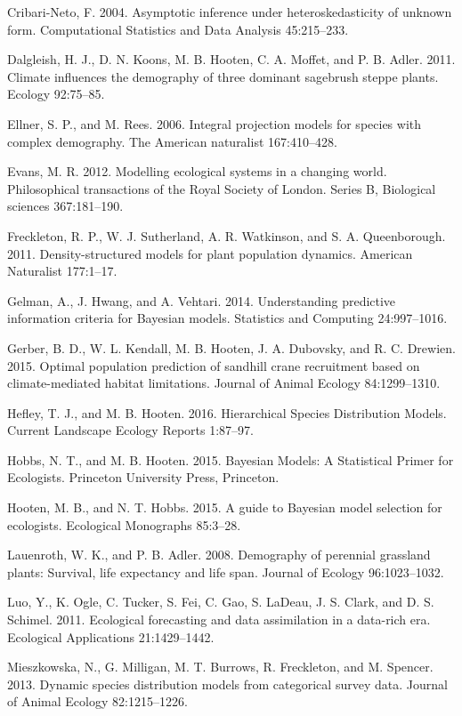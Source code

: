 \documentclass[12pt,]{article}
\begin{document}
Cribari-Neto, F. 2004. Asymptotic inference under heteroskedasticity of
unknown form. Computational Statistics and Data Analysis 45:215--233.

Dalgleish, H. J., D. N. Koons, M. B. Hooten, C. A. Moffet, and P. B.
Adler. 2011. Climate influences the demography of three dominant
sagebrush steppe plants. Ecology 92:75--85.

Ellner, S. P., and M. Rees. 2006. Integral projection models for species
with complex demography. The American naturalist 167:410--428.

Evans, M. R. 2012. Modelling ecological systems in a changing world.
Philosophical transactions of the Royal Society of London. Series B,
Biological sciences 367:181--190.

Freckleton, R. P., W. J. Sutherland, A. R. Watkinson, and S. A.
Queenborough. 2011. Density-structured models for plant population
dynamics. American Naturalist 177:1--17.

Gelman, A., J. Hwang, and A. Vehtari. 2014. Understanding predictive
information criteria for Bayesian models. Statistics and Computing
24:997--1016.

Gerber, B. D., W. L. Kendall, M. B. Hooten, J. A. Dubovsky, and R. C.
Drewien. 2015. Optimal population prediction of sandhill crane
recruitment based on climate-mediated habitat limitations. Journal of
Animal Ecology 84:1299--1310.

Hefley, T. J., and M. B. Hooten. 2016. Hierarchical Species Distribution
Models. Current Landscape Ecology Reports 1:87--97.

Hobbs, N. T., and M. B. Hooten. 2015. Bayesian Models: A Statistical
Primer for Ecologists. Princeton University Press, Princeton.

Hooten, M. B., and N. T. Hobbs. 2015. A guide to Bayesian model
selection for ecologists. Ecological Monographs 85:3--28.

Lauenroth, W. K., and P. B. Adler. 2008. Demography of perennial
grassland plants: Survival, life expectancy and life span. Journal of
Ecology 96:1023--1032.

Luo, Y., K. Ogle, C. Tucker, S. Fei, C. Gao, S. LaDeau, J. S. Clark, and
D. S. Schimel. 2011. Ecological forecasting and data assimilation in a
data-rich era. Ecological Applications 21:1429--1442.

Mieszkowska, N., G. Milligan, M. T. Burrows, R. Freckleton, and M.
Spencer. 2013. Dynamic species distribution models from categorical
survey data. Journal of Animal Ecology 82:1215--1226.
\end{document}
